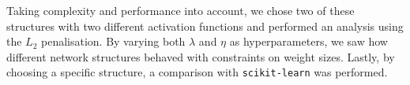     Taking complexity and performance into account, we chose two of these structures with two different activation functions and performed an analysis using the $L_2$ penalisation. By varying both $\lambda$ and $\eta$ as hyperparameters, we saw how different network structures behaved with constraints on weight sizes. Lastly, by choosing a specific structure, a comparison with \verb|scikit-learn| was performed.
